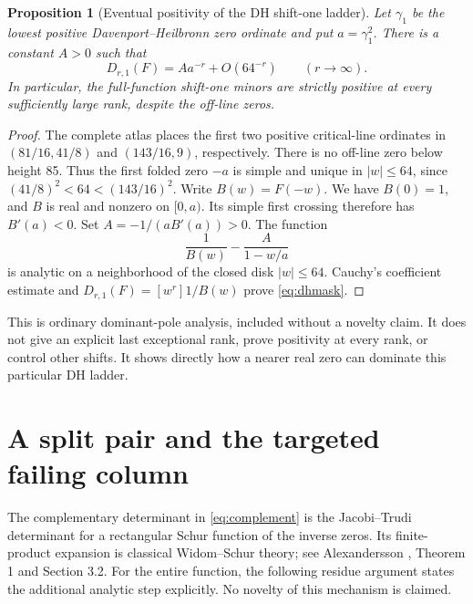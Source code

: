 \documentclass[11pt]{article}
\newtheorem{proposition}[theorem]{Proposition}
\theoremstyle{remark}
\begin{document}
\begin{proposition}[Eventual positivity of the DH shift-one ladder]\label{prop:dhmask}
Let \(\gamma_1\) be the lowest positive Davenport--Heilbronn zero ordinate
and put \(a=\gamma_1^2\). There is a constant \(A>0\) such that
\begin{equation}\label{eq:dhmask}
 D_{r,1}(F)=A a^{-r}+O(64^{-r})\qquad(r\longrightarrow\infty).
\end{equation}
In particular, the full-function shift-one minors are strictly positive
at every sufficiently large rank, despite the off-line zeros.
\end{proposition}
\begin{proof}
The complete atlas places the first two positive critical-line ordinates
in \((81/16,41/8)\) and \((143/16,9)\), respectively.
There is no off-line zero below height 85. Thus the first folded zero
\(-a\) is simple and unique in \(|w|\le64\), since
\((41/8)^2<64<(143/16)^2\).
Write \(B(w)=F(-w)\). We have \(B(0)=1\), and \(B\) is real and
nonzero on \([0,a)\). Its simple first crossing therefore has
\(B'(a)<0\). Set \(A=-1/(aB'(a))>0\).
The function
\[
 \frac1{B(w)}-\frac{A}{1-w/a}
\]
is analytic on a neighborhood of the closed disk \(|w|\le64\).
Cauchy's coefficient estimate and
\(D_{r,1}(F)=[w^r]1/B(w)\) prove \eqref{eq:dhmask}.
\end{proof}
This is ordinary dominant-pole analysis, included without a novelty claim.
It does not give an explicit last exceptional rank, prove positivity at
every rank, or control other shifts. It shows directly how a nearer real
zero can dominate this particular DH ladder.

\section{A split pair and the targeted failing column}\label{sec:splitpair}
The complementary determinant in \eqref{eq:complement} is the
Jacobi--Trudi determinant for a rectangular Schur function of the inverse
zeros. Its finite-product expansion is classical Widom--Schur theory;
see Alexandersson \cite{alexandersson2012}, Theorem 1 and Section 3.2.
For the entire function, the following residue argument states the
additional analytic step explicitly. No novelty of this mechanism is claimed.
\end{document}
